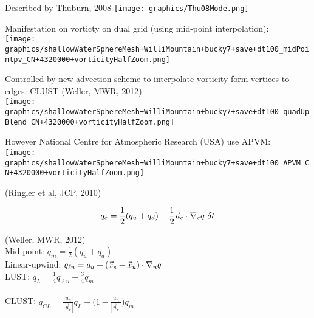 \begin{slide}

\begin{minipage}{0.49\linewidth}\centering
Described by Thuburn, 2008
\texttt{[image: graphics/Thu08Mode.png]}
\pauseHS
\end{minipage}
\begin{minipage}{0.49\linewidth}
Manifestation on vorticty on dual grid (using mid-point interpolation):\\
\texttt{[image: graphics/shallowWaterSphereMesh+WilliMountain+bucky7+save+dt100\_midPointpv\_CN+4320000+vorticityHalfZoom.png]}
\pauseHS
\end{minipage}
\begin{minipage}{0.49\linewidth}\raggedright
Controlled by new advection scheme to interpolate vorticity form vertices to edges: CLUST (Weller, MWR, 2012)\\
\texttt{[image: graphics/shallowWaterSphereMesh+WilliMountain+bucky7+save+dt100\_quadUpBlend\_CN+4320000+vorticityHalfZoom.png]}
\pauseHS
\end{minipage}
\begin{minipage}{0.49\linewidth}\centering
However National Centre for Atmospheric Research (USA) use APVM:\\
\texttt{[image: graphics/shallowWaterSphereMesh+WilliMountain+bucky7+save+dt100\_APVM\_CN+4320000+vorticityHalfZoom.png]}
\end{minipage}

\end{slide}

\begin{slide}
\vspace{2cm}
\begin{minipage}[t]{0.49\linewidth}
(Ringler et al, JCP, 2010)

\[q_e = \frac{1}{2}(q_{u} + q_{d}) - \frac{1}{2}\vec{u}_e \cdot\nabla_e q ~ \delta t\]


\end{minipage}
%
\begin{minipage}[t]{0.49\linewidth}
(Weller, MWR, 2012)
\ \\

Mid-point: \(q_m = \frac{1}{2}(q_{u} + q_{d})\) \ \\

Linear-upwind: \(q_{\ell u} = q_u + (\vec{x}_e - \vec{x}_u) \cdot \nabla_u q\) \ \\

LUST: \(q_L = \frac{1}{4} q_{\ell u} + \frac{3}{4} q_m\) \ \\ \ \\

CLUST: \(q_{CL} = \frac{|u_n|}{|\vec{u}_e|} q_{L} + \biggl(1 - \frac{|u_n|}{|\vec{u}_e|}\biggr) q_m\)

\end{minipage}

\end{slide}
